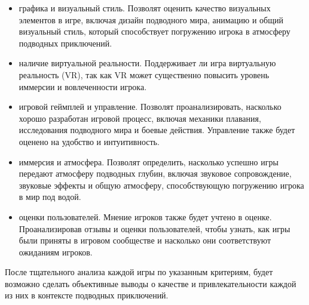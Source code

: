 \documentclass{../mirea-prog-lang}
\begin{document}
\begin{itemize}
	\item графика и визуальный стиль. Позволят оценить качество визуальных элементов в игре, включая дизайн подводного мира, анимацию и общий визуальный стиль, который способствует погружению игрока в атмосферу подводных приключений.
	
	\item наличие виртуальной реальности. Поддерживает ли игра виртуальную реальность (VR), так как VR может существенно повысить уровень иммерсии и вовлеченности игрока.
	
	\item игровой геймплей и управление. Позволят проанализировать, насколько хорошо разработан игровой процесс, включая механики плавания, исследования подводного мира и боевые действия. Управление также будет оценено на удобство и интуитивность.
	
	\item иммерсия и атмосфера. Позволят определить, насколько успешно игры передают атмосферу подводных глубин, включая звуковое сопровождение, звуковые эффекты и общую атмосферу, способствующую погружению игрока в мир под водой.
	
	\item оценки пользователей. Мнение игроков также будет учтено в оценке. Проанализировав отзывы и оценки пользователей, чтобы узнать, как игры были приняты в игровом сообществе и насколько они соответствуют ожиданиям игроков.
\end{itemize}

После тщательного анализа каждой игры по указанным критериям, будет возможно сделать объективные выводы о качестве и привлекательности каждой из них в контексте подводных приключений.
\end{document}
